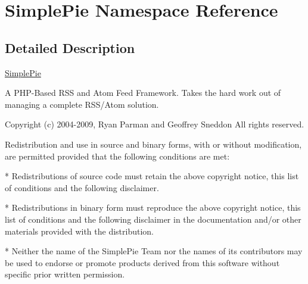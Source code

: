 \hypertarget{namespace_simple_pie}{\section{Simple\-Pie Namespace Reference}
\label{namespace_simple_pie}
}


\subsection{Detailed Description}
\hyperlink{class_simple_pie}{Simple\-Pie}

A P\-H\-P-\/\-Based R\-S\-S and Atom Feed Framework. Takes the hard work out of managing a complete R\-S\-S/\-Atom solution.

Copyright (c) 2004-\/2009, Ryan Parman and Geoffrey Sneddon All rights reserved.

Redistribution and use in source and binary forms, with or without modification, are permitted provided that the following conditions are met\-: \begin{DoxyVerb}* Redistributions of source code must retain the above copyright notice, this list of
  conditions and the following disclaimer.

* Redistributions in binary form must reproduce the above copyright notice, this list
  of conditions and the following disclaimer in the documentation and/or other materials
  provided with the distribution.

* Neither the name of the SimplePie Team nor the names of its contributors may be used
  to endorse or promote products derived from this software without specific prior
  written permission.
\end{DoxyVerb}


